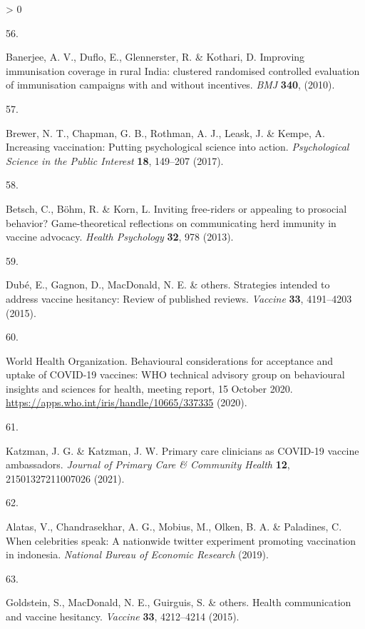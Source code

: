 \documentclass[
  12pt,
]{article}
\newlength{\cslhangindent}
\newlength{\csllabelwidth}
\newenvironment{CSLReferences}[2] %
 {%
  \setlength{\parindent}{0pt}
  \ifodd #1 \everypar{\setlength{\hangindent}{\cslhangindent}}\ignorespaces\fi
  \ifnum #2 > 0
  \setlength{\parskip}{#2\baselineskip}
  \fi
 }%
 {}
\newcommand{\CSLLeftMargin}[1]{\parbox[t]{\csllabelwidth}{#1}}
\newcommand{\CSLRightInline}[1]{\parbox[t]{\linewidth - \csllabelwidth}{#1}\break}
\begin{document}
\begin{CSLReferences}{0}{0}
\leavevmode\hypertarget{ref-Banerjee2010}{}%
\CSLLeftMargin{56. }
\CSLRightInline{Banerjee, A. V., Duflo, E., Glennerster, R. \& Kothari, D. {Improving immunisation coverage in rural India: clustered randomised controlled evaluation of immunisation campaigns with and without incentives}. \emph{BMJ} \textbf{340}, (2010).}

\leavevmode\hypertarget{ref-brewer2017increasing}{}%
\CSLLeftMargin{57. }
\CSLRightInline{Brewer, N. T., Chapman, G. B., Rothman, A. J., Leask, J. \& Kempe, A. Increasing vaccination: Putting psychological science into action. \emph{Psychological Science in the Public Interest} \textbf{18}, 149--207 (2017).}

\leavevmode\hypertarget{ref-betsch2013inviting}{}%
\CSLLeftMargin{58. }
\CSLRightInline{Betsch, C., Böhm, R. \& Korn, L. Inviting free-riders or appealing to prosocial behavior? Game-theoretical reflections on communicating herd immunity in vaccine advocacy. \emph{Health Psychology} \textbf{32}, 978 (2013).}

\leavevmode\hypertarget{ref-dube2015strategies}{}%
\CSLLeftMargin{59. }
\CSLRightInline{Dubé, E., Gagnon, D., MacDonald, N. E. \& others. Strategies intended to address vaccine hesitancy: Review of published reviews. \emph{Vaccine} \textbf{33}, 4191--4203 (2015).}

\leavevmode\hypertarget{ref-who2020behavioral}{}%
\CSLLeftMargin{60. }
\CSLRightInline{World Health Organization. {Behavioural considerations for acceptance and uptake of COVID-19 vaccines: WHO technical advisory group on behavioural insights and sciences for health, meeting report, 15 October 2020}. \url{https://apps.who.int/iris/handle/10665/337335} (2020).}

\leavevmode\hypertarget{ref-katzman2021primary}{}%
\CSLLeftMargin{61. }
\CSLRightInline{Katzman, J. G. \& Katzman, J. W. Primary care clinicians as COVID-19 vaccine ambassadors. \emph{Journal of Primary Care \& Community Health} \textbf{12}, 21501327211007026 (2021).}

\leavevmode\hypertarget{ref-alatas2019celebrities}{}%
\CSLLeftMargin{62. }
\CSLRightInline{Alatas, V., Chandrasekhar, A. G., Mobius, M., Olken, B. A. \& Paladines, C. When celebrities speak: A nationwide twitter experiment promoting vaccination in indonesia. \emph{National Bureau of Economic Research} (2019).}

\leavevmode\hypertarget{ref-goldstein2015health}{}%
\CSLLeftMargin{63. }
\CSLRightInline{Goldstein, S., MacDonald, N. E., Guirguis, S. \& others. Health communication and vaccine hesitancy. \emph{Vaccine} \textbf{33}, 4212--4214 (2015).}


\end{CSLReferences}
\end{document}
